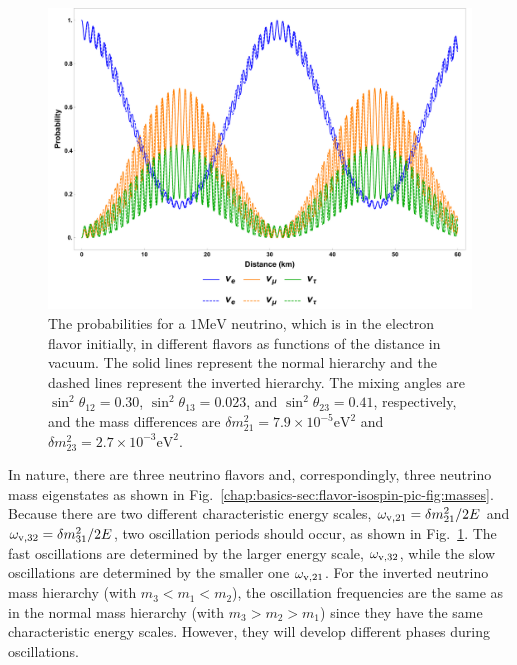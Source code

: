 \begin{figure}[htbp]
    \centering
    \includegraphics[width=\textwidth]{chapters/assets/basics/vacuum-oscillations-3-flavor.pdf}
    \caption{The probabilities for a $1\mathrm{MeV}$ neutrino, which is in the electron flavor initially, in different flavors as functions of the distance in vacuum. The solid lines represent the normal hierarchy and the dashed lines represent the inverted hierarchy. The mixing angles are $\sin^2\theta_{12}=0.30$, $\sin^2\theta_{13}=0.023$, and $\sin^2\theta_{23}=0.41$, respectively, and the mass differences are $\delta m_{21}^2 = 7.9\times 10^{-5}\mathrm{eV^2}$ and $\delta m^2_{23}=2.7\times 10^{-3}\mathrm{eV^2}$.}
    \label{chap:basics-section:neutrinos-fig:vacuum-3-flavor-osc}
\end{figure}


In nature, there are three neutrino flavors and, correspondingly, three neutrino mass eigenstates as shown in Fig.~\ref{chap:basics-sec:flavor-isospin-pic-fig:masses}. Because there are two different characteristic energy scales, $\omega_{\mathrm v,21}=\delta m_{21}^2/2E$ and $\omega_{\mathrm v,32}=\delta m_{31}^2/2E$, two oscillation periods should occur, as shown in Fig.~\ref{chap:basics-section:neutrinos-fig:vacuum-3-flavor-osc}. The fast oscillations are determined by the larger energy scale, $\omega_{\mathrm v,32}$, while the slow oscillations are determined by the smaller one $\omega_{\mathrm v,21}$. For the inverted neutrino mass hierarchy (with $m_3 < m_1 < m_2$), the oscillation frequencies are the same as in the normal mass hierarchy (with $m_3>m_2>m_1$) since they have the same characteristic energy scales. However, they will develop different phases during oscillations.

